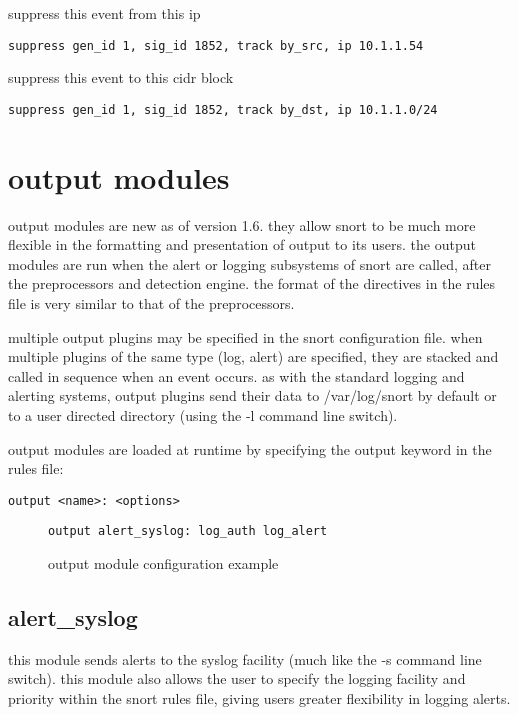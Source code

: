 \documentclass[english]{report}
\begin{document}
suppress this event from this ip
\begin{verbatim}
suppress gen_id 1, sig_id 1852, track by_src, ip 10.1.1.54
\end{verbatim}

suppress this event to this cidr block
\begin{verbatim}
suppress gen_id 1, sig_id 1852, track by_dst, ip 10.1.1.0/24
\end{verbatim}

\newpage
\section{output modules}

output modules are new as of version 1.6. they allow snort to be much
more flexible in the formatting and presentation of output to its
users. the output modules are run when the alert or logging subsystems
of snort are called, after the preprocessors and detection engine.
the format of the directives in the rules file is very similar to
that of the preprocessors.

multiple output plugins may be specified in the snort configuration
file. when multiple plugins of the same type (log, alert) are specified,
they are stacked and called in sequence when an
event occurs. as with the standard logging and alerting systems, output
plugins send their data to /var/log/snort by default or to a user
directed directory (using the -l command line
switch).

output modules are loaded at runtime by specifying the output keyword
in the rules file:

\begin{verbatim}
output <name>: <options>
\end{verbatim}

\begin{figure}[!hbpt]
\begin{verbatim}
output alert_syslog: log_auth log_alert
\end{verbatim}

\caption{\label{output config example}output module configuration example}
\end{figure}

\subsection{alert\_syslog \label{alert syslog lable}}

this module sends alerts to the syslog facility (much like the -s
command line switch). this module also allows the user to specify
the logging facility and priority within the snort rules file, giving
users greater flexibility in logging alerts.
\end{document}
